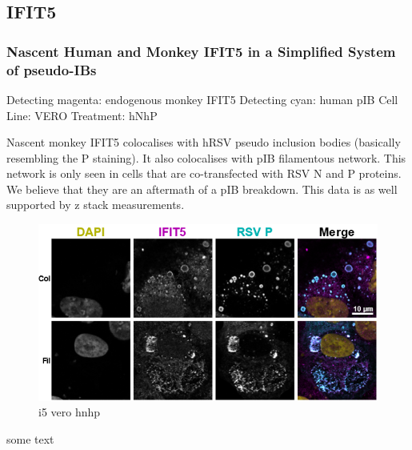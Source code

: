 \subsection{IFIT5} \label{IFIT5}
\subsubsection{Nascent Human and Monkey IFIT5 in a Simplified System of pseudo-IBs} \label{Nascent Human and Monkey IFIT5 in a Simplified System of pseudo-IBs}
Detecting magenta: endogenous monkey IFIT5 \newline
Detecting cyan: human pIB \newline
Cell Line: VERO \newline
Treatment: hNhP \newline

Nascent monkey IFIT5 colocalises with hRSV pseudo inclusion bodies (basically resembling the P staining). It also colocalises with pIB filamentous network. This network is only seen in cells that are co-transfected with RSV N and P proteins. We believe that they are an aftermath of a pIB breakdown. This data is as well supported by z stack measurements.

\begin{figure}
    \centering
    \includegraphics[width=1\linewidth]{08. Chapter 3/Figs/05. IFIT5/01. vero hnhp.png}
    \caption[i5 vero hnhp]{i5 vero hnhp}
    \label{i5 vero hnhp}
\end{figure}

some text

